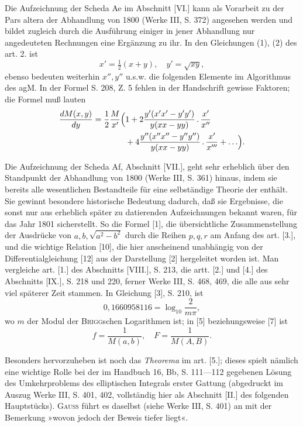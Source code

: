 \begingroup
{}
\begin{center}\end{center}
\par\indent Die Aufzeichnung der Scheda Ae im Abschnitt [VI.] kann als Vorarbeit zu der Pars altera der Abhandlung von 1800 (Werke III, S. 372) angesehen werden und bildet zugleich durch die Ausführung einiger in jener Abhandlung nur angedeuteten Rechnungen eine Ergänzung zu ihr. In den Gleichungen (1), (2) des art. 2. ist
\[x'=\tfrac12(x+y),\quad y'=\sqrt{xy},\]
\noindent ebenso bedeuten weiterhin $x'',y''$ u.s.w. die folgenden Elemente im Algorithmus des agM. In der Formel S. 208, Z. 5 fehlen in der Handschrift gewisse Faktoren; die Formel muß lauten
\[\begin{aligned}
\frac{dM(x,y)}{dy}=\frac12\frac M{x'}\Bigl(&1+2\frac{y'(x'x'-y'y')}{y(xx-yy)}\,.\,\frac{x'}{x''}\\
&+4\frac{y''(x''x''-y''y'')}{y(xx-yy)}\,.\,\frac{x'}{x'''}+\ldots\Bigr).
\end{aligned}\]
\par\indent Die Aufzeichnung der Scheda Af, Abschnitt [VII.], geht sehr erheblich über den Standpunkt der Abhandlung von 1800 (Werke III, S. 361) hinaus, indem sie bereits alle wesentlichen Bestandteile für eine selbständige Theorie der  enthält. Sie gewinnt besondere historische Bedeutung dadurch, daß sie Ergebnisse, die sonst nur aus erheblich später zu datierenden Aufzeichnungen bekannt waren, für das Jahr 1801 sicherstellt. So die Formel [1], die übersichtliche Zusammenstellung der Ausdrücke von $a,b,\sqrt{a^2-b^2}$ durch die Reihen $p,q,r$ am Anfang des art. [3.], und die wichtige Relation [10], die hier anscheinend unabhängig von der Differentialgleichung [12] aus der Darstellung [2] hergeleitet worden ist.
\clearpage
\fancyhead{}
\noindent Man vergleiche art. [1.] des Abschnitts [VIII.], S. 213, die artt. [2.] und [4.] des Abschnitts [IX.], S. 218 und 220, ferner Werke III, S. 468, 469, die alle aus sehr viel späterer Zeit stammen. In Gleichung [3], S. 210, ist
\[0{,}1660958116=\log_{10}\frac2{m\pi},\]
\noindent wo $m$ der Modul der \textsc{Brigg}schen Logarithmen ist; in [5] beziehungsweise [7] ist
\[f=\frac1{M(a,b)},\quad F=\frac1{M(A,B)}.\]
\par\indent Besonders hervorzuheben ist noch das \textit{Theorema} im art. [5.]; dieses spielt nämlich eine wichtige Rolle bei der im Handbuch 16, Bb, S. 111—112 gegebenen Lösung des Umkehrproblems des elliptischen Integrals erster Gattung (abgedruckt im Auszug Werke III, S. 401, 402, vollständig hier als Abschnitt [II.] des folgenden Hauptstücks). \textsc{Gauss} führt es daselbst (siehe Werke III, S. 401) an mit der Bemerkung »wovon jedoch der Beweis tiefer liegt«.
\clearpage
\endgroup

